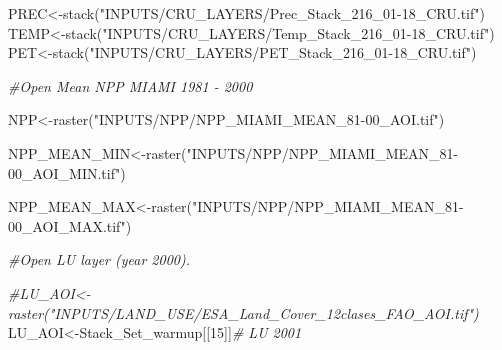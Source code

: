 \documentclass[
  10pt,
  b5paper,
]{book}
\newenvironment{Shaded}{\begin{snugshade}}{\end{snugshade}}
\newcommand{\CommentTok}[1]{\textcolor[rgb]{0.56,0.35,0.01}{\textit{#1}}}
\newcommand{\DecValTok}[1]{\textcolor[rgb]{0.00,0.00,0.81}{#1}}
\newcommand{\FunctionTok}[1]{\textcolor[rgb]{0.00,0.00,0.00}{#1}}
\newcommand{\NormalTok}[1]{#1}
\newcommand{\OtherTok}[1]{\textcolor[rgb]{0.56,0.35,0.01}{#1}}
\newcommand{\StringTok}[1]{\textcolor[rgb]{0.31,0.60,0.02}{#1}}
\begin{document}
\begin{Shaded}
\begin{Highlighting}[]
\NormalTok{PREC}\OtherTok{\textless{}{-}}\FunctionTok{stack}\NormalTok{(}\StringTok{"INPUTS/CRU\_LAYERS/Prec\_Stack\_216\_01{-}18\_CRU.tif"}\NormalTok{)}
\NormalTok{TEMP}\OtherTok{\textless{}{-}}\FunctionTok{stack}\NormalTok{(}\StringTok{"INPUTS/CRU\_LAYERS/Temp\_Stack\_216\_01{-}18\_CRU.tif"}\NormalTok{)}
\NormalTok{PET}\OtherTok{\textless{}{-}}\FunctionTok{stack}\NormalTok{(}\StringTok{"INPUTS/CRU\_LAYERS/PET\_Stack\_216\_01{-}18\_CRU.tif"}\NormalTok{)}

\CommentTok{\#Open Mean NPP MIAMI 1981 {-} 2000}

\NormalTok{NPP}\OtherTok{\textless{}{-}}\FunctionTok{raster}\NormalTok{(}\StringTok{"INPUTS/NPP/NPP\_MIAMI\_MEAN\_81{-}00\_AOI.tif"}\NormalTok{)}

\NormalTok{NPP\_MEAN\_MIN}\OtherTok{\textless{}{-}}\FunctionTok{raster}\NormalTok{(}\StringTok{"INPUTS/NPP/NPP\_MIAMI\_MEAN\_81{-}00\_AOI\_MIN.tif"}\NormalTok{)}

\NormalTok{NPP\_MEAN\_MAX}\OtherTok{\textless{}{-}}\FunctionTok{raster}\NormalTok{(}\StringTok{"INPUTS/NPP/NPP\_MIAMI\_MEAN\_81{-}00\_AOI\_MAX.tif"}\NormalTok{)}

\CommentTok{\#Open LU layer (year 2000).}

\CommentTok{\#LU\_AOI\textless{}{-}raster("INPUTS/LAND\_USE/ESA\_Land\_Cover\_12clases\_FAO\_AOI.tif")}
\NormalTok{LU\_AOI}\OtherTok{\textless{}{-}}\NormalTok{Stack\_Set\_warmup[[}\DecValTok{15}\NormalTok{]]}\CommentTok{\# LU 2001 }
  

\end{Highlighting}
\end{Shaded}
\end{document}
